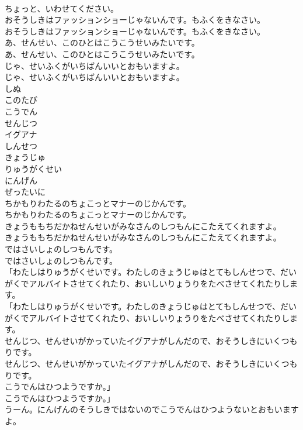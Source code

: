 \documentclass[8pt]{extreport}
\begin{document}
\begin{CJK}{UTF8}{min}
\\	ちょっと、いわせてください。
\\	おそうしきはファッションショーじゃないんです。もふくをきなさい。
\\	おそうしきはファッションショーじゃないんです。もふくをきなさい。
\\	あ、せんせい、このひとはこうこうせいみたいです。
\\	あ、せんせい、このひとはこうこうせいみたいです。
\\	じゃ、せいふくがいちばんいいとおもいますよ。
\\	じゃ、せいふくがいちばんいいとおもいますよ。
\\	しぬ
\\	このたび
\\	こうでん
\\	せんじつ
\\	イグアナ
\\	しんせつ
\\	きょうじゅ
\\	りゅうがくせい
\\	にんげん
\\	ぜったいに
\\	ちかもりわたるのちょこっとマナーのじかんです。
\\	ちかもりわたるのちょこっとマナーのじかんです。
\\	きょうももちだかねせんせいがみなさんのしつもんにこたえてくれますよ。
\\	きょうももちだかねせんせいがみなさんのしつもんにこたえてくれますよ。
\\	ではさいしょのしつもんです。
\\	ではさいしょのしつもんです。
\\	「わたしはりゅうがくせいです。わたしのきょうじゅはとてもしんせつで、だいがくでアルバイトさせてくれたり、おいしいりょうりをたべさせてくれたりします。
\\	「わたしはりゅうがくせいです。わたしのきょうじゅはとてもしんせつで、だいがくでアルバイトさせてくれたり、おいしいりょうりをたべさせてくれたりします。
\\	せんじつ、せんせいがかっていたイグアナがしんだので、おそうしきにいくつもりです。
\\	せんじつ、せんせいがかっていたイグアナがしんだので、おそうしきにいくつもりです。
\\	こうでんはひつようですか。」
\\	こうでんはひつようですか。」
\\	うーん。にんげんのそうしきではないのでこうでんはひつようないとおもいますよ。

\end{CJK}
\end{document}
